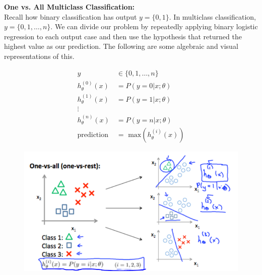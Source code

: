 \documentclass{article}
\begin{document}
        \noindent \textbf{One vs. All Multiclass Classification:} \\
        Recall how binary classification has output $y=\{0,1\}$. In multiclass classification, $y=\{0,1,\dots,n\}$.
        We can divide our problem by repeatedly applying binary logistic regression to each output case and
        then use the hypothesis that returned the highest value as our prediction. The following are some
        algebraic and visual representations of this.

        \begin{align*}
            y                   & \in\{0,1,\dots,n\} \\
            h_{\theta}^{(0)}(x) &= P(y=0|x;\theta) \\
            h_{\theta}^{(1)}(x) &= P(y=1|x;\theta) \\
            \vdots \\
            h_{\theta}^{(n)}(x) &= P(y=n|x;\theta) \\
            \text{prediction }  &= \text{ max}(h_{\theta}^{(i)}(x))
        \end{align*}

        \begin{figure}[hbt!]
            \centering
            \includegraphics[scale=0.9]{Resources/Multiclass_Classification}
        \end{figure}



    \pagebreak
\end{document}
